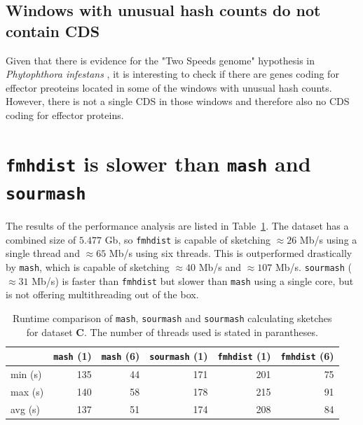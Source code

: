 \subsection*{Windows with unusual hash counts do not contain CDS}
Given that there is evidence for the "Two Speeds genome" hypothesis in
\textit{Phytophthora infestans} \cite{dongTwospeedGenomesFilamentous2015}, it is
interesting to check if there are genes coding for effector preoteins located in
some of the windows with unusual hash counts. However, there is not a single CDS
in those windows and therefore also no CDS coding for effector proteins.


\section{\texttt{fmhdist} is slower than \texttt{mash} and \texttt{sourmash}}
The results of the performance analysis are listed in
Table~\ref{ta:performance}. The dataset has a combined size of $5.477$ Gb,
so \texttt{fmhdist} is capable of sketching $\approx 26$ Mb/s using a single
thread and $\approx 65$ Mb/s using six threads. This is outperformed
drastically by \texttt{mash}, which is capable of sketching $\approx 40$ Mb/s
and $\approx 107$ Mb/s. \texttt{sourmash} ($\approx 31$ Mb/s) is faster than
\texttt{fmhdist} but slower than \texttt{mash} using a single core, but is not
offering multithreading out of the box. 

\begin{table}[]
  \centering
  \begin{tabular}{@{}lrrrrr@{}}
  \toprule
                  & \texttt{mash} (1)     & \texttt{mash} (6) & \texttt{sourmash} (1) & \texttt{fmhdist} (1) & \texttt{fmhdist} (6) \\ \midrule
  min (s) & 135                     &  44                     &  171              &  201                      & 75                         \\
  max (s) & 140                     &  58                     &  178              &  215                      & 91                         \\
  avg (s) & 137                     &  51                     &  174              &  208                      & 84                         \\ \bottomrule
  \end{tabular}
  \caption[Runtime comparison of \texttt{mash}, \texttt{sourmash} and
  \texttt{sourmash} calculating sketches for dataset \textbf{C}]{Runtime
  comparison of \texttt{mash}, \texttt{sourmash} and \texttt{sourmash}
  calculating sketches for dataset \textbf{C}. The number of threads used is
  stated in parantheses.}
  \label{ta:performance}
\end{table}

\clearpage
